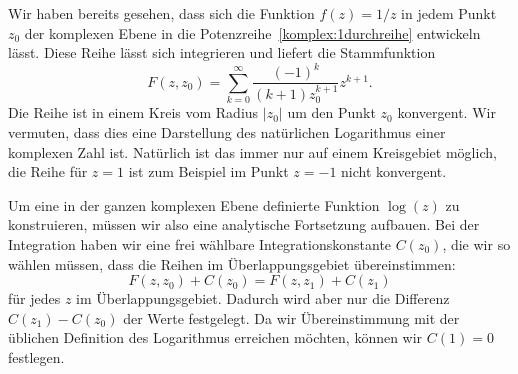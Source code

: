 \begin{beispiel}
Wir haben bereits gesehen, dass sich die Funktion $f(z)=1/z$ in jedem
Punkt $z_0$ der komplexen Ebene in die Potenzreihe~\eqref{komplex:1durchreihe}
entwickeln lässt.
Diese Reihe lässt sich integrieren und liefert die Stammfunktion
\[
F(z,z_0)
=
\sum_{k=0}^\infty\frac{(-1)^k}{(k+1)z_0^{k+1}}z^{k+1}.
\]
Die Reihe ist in einem Kreis vom Radius $|z_0|$ um den
Punkt $z_0$ konvergent.
Wir vermuten, dass dies eine Darstellung des natürlichen
Logarithmus einer komplexen Zahl ist.
Natürlich ist das immer nur auf einem Kreisgebiet möglich, die Reihe
für $z=1$ ist zum Beispiel im Punkt $z=-1$ nicht konvergent.

Um eine in der ganzen komplexen Ebene definierte Funktion $\log(z)$ zu
konstruieren, müssen wir also eine analytische Fortsetzung aufbauen.
Bei der Integration haben wir eine frei wählbare Integrationskonstante
$C(z_0)$, die wir so wählen müssen, dass die Reihen im Überlappungsgebiet
übereinstimmen:
\[
F(z,z_0) + C(z_0) = F(z,z_1)  + C(z_1)
\]
für jedes $z$ im Überlappungsgebiet.
Dadurch wird aber nur die Differenz $C(z_1)-C(z_0)$ der Werte festgelegt.
Da wir Übereinstimmung mit der üblichen Definition des Logarithmus
erreichen möchten, können wir $C(1)=0$ festlegen.


\end{beispiel}
